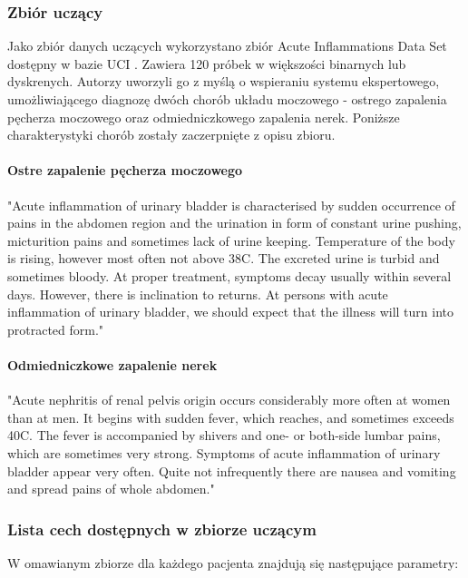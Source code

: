 \documentclass{article}
\begin{document}
\subsubsection{Zbiór uczący}
Jako zbiór danych uczących wykorzystano zbiór Acute Inflammations Data Set dostępny w bazie UCI \cite{data set}. Zawiera 120 próbek w większości binarnych lub dyskrenych. Autorzy uworzyli go z myślą o wspieraniu systemu ekspertowego, umożliwiającego diagnozę dwóch chorób układu moczowego - ostrego zapalenia pęcherza moczowego oraz odmiedniczkowego zapalenia nerek. Poniższe charakterystyki chorób zostały zaczerpnięte z opisu zbioru.

\paragraph{Ostre zapalenie pęcherza moczowego}
"Acute inflammation of urinary bladder is
characterised by sudden occurrence of pains in the abdomen region and 
the urination in form of constant urine pushing, micturition pains and 
sometimes lack of urine keeping. Temperature of the body is rising, 
however most often not above 38C. The excreted urine is turbid and 
sometimes bloody. At proper treatment, symptoms decay usually within 
several days. However, there is inclination to returns. At persons with 
acute inflammation of urinary bladder, we should expect that the illness 
will turn into protracted form."

\paragraph{Odmiedniczkowe zapalenie nerek}
"Acute nephritis of renal pelvis origin occurs considerably more often at 
women than at men. It begins with sudden fever, which reaches, and 
sometimes exceeds 40C. The fever is accompanied by shivers and one- or 
both-side lumbar pains, which are sometimes very strong. Symptoms of 
acute inflammation of urinary bladder appear very often. Quite not 
infrequently there are nausea and vomiting and spread pains of whole 
abdomen."

\subsubsection{Lista cech dostępnych w zbiorze uczącym}

W omawianym zbiorze dla każdego pacjenta znajdują się następujące parametry:
\end{document}
